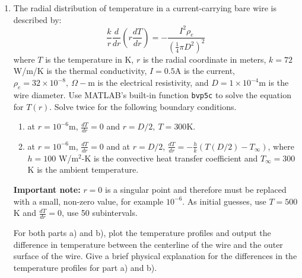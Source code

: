 \begin{fullwidth}
\begin{enumerate}
\begin{enumerate}
\end{enumerate}

\pagebreak

\item The radial distribution of temperature in a current-carrying bare wire is described by:
\begin{equation*}
\frac{k}{r}\frac{d}{dr}\left(r \frac{dT}{dr}\right)=-\frac{I^2 \rho_e}{\left(\frac{1}{4}\pi D^2 \right)^2}
\end{equation*}
where $T$ is the temperature in K, $r$ is the radial coordinate in meters, $k=72$ W/m/K is the thermal conductivity, $I=0.5$A is the current, $\rho_e=32\times 10^{-8}, \ \Omega-$m is the electrical resistivity, and $D=1 \times 10^{-4}$m is the wire diameter. Use MATLAB's built-in function \lstinline[style=myMatlab]{bvp5c} to solve the equation for $T(r)$.  Solve twice for the following boundary conditions.
\begin{enumerate}
\item at $r=10^{-6}$m, $\frac{dT}{dr}=0$ and $r= D/2, \ T=300$K.
\item at $r=10^{-6}$m, $\frac{dT}{dr}=0$ and at $r=D/2$, $\frac{dT}{dr}=-\frac{h}{k}\left(T(D/2)-T_{\infty}\right)$, where $h=100$ W/m$^{2}$-K is the convective heat transfer coefficient and $T_{\infty}=300$K is the ambient temperature.
\end{enumerate}

\vspace{0.25cm}

\noindent \textbf{Important note:} $r=0$ is a singular point and therefore must be replaced with a small, non-zero value, for example $10^{-6}$.  As initial guesses, use $T=500$K and $\frac{dT}{dr}=0$, use 50 subintervals.

\vspace{0.25cm}

\noindent For both parts a) and b), plot the temperature profiles and output the difference in temperature between the centerline of the wire and the outer surface of the wire.  Give a brief physical explanation for the differences in the temperature profiles for part a) and b).  

\end{enumerate}



\end{fullwidth}
